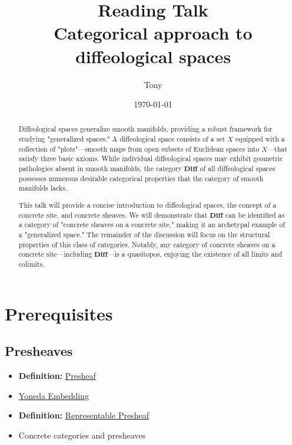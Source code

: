 \documentclass[a4paper,11pt,fleqn]{article}  %
\title{Reading Talk \\ Categorical approach to diffeological spaces}
\author{Tony}
\date{\today}
\begin{document}
\maketitle

\begin{abstract}
Diffeological spaces generalize smooth manifolds, providing a robust framework for studying "generalized spaces." A diffeological space consists of a set $X$ equipped with a collection of "plots"—smooth maps from open subsets of Euclidean spaces into $X$—that satisfy three basic axioms. While individual diffeological spaces may exhibit geometric pathologies absent in smooth manifolds, the category $\mathbf{Diff}$ of all diffeological spaces possesses numerous desirable categorical properties that the category of smooth manifolds lacks.

This talk will provide a concise introduction to diffeological spaces, the concept of a concrete site, and concrete sheaves. We will demonstrate that $\mathbf{Diff}$ can be identified as a category of "concrete sheaves on a concrete site," making it an archetypal example of a "generalized space." The remainder of the discussion will focus on the structural properties of this class of categories. Notably, any category of concrete sheaves on a concrete site—including $\mathbf{Diff}$—is a quasitopos, enjoying the existence of all limits and colimits.
\end{abstract}

\section{Prerequisites}

\subsection{Presheaves}
\begin{itemize}
    \item \textbf{Definition:} \href{https://ncatlab.org/nlab/show/presheaf}{Presheaf}
    \item \href{https://ncatlab.org/nlab/show/Yoneda+embedding}{Yoneda Embedding}
    \item \textbf{Definition:} \href{https://ncatlab.org/nlab/show/representable+functor}{Representable Presheaf}
    \item Concrete categories and presheaves
\end{itemize}
\end{document}
